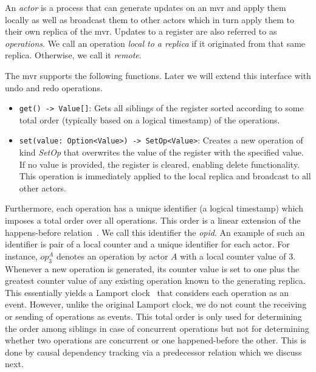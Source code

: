 \documentclass[sigplan,natbib=false,review]{acmart}
\newcommand{\op}[3][op]{$\mathit{#1}_{#2}^{#3}$} %
\newcommand{\setopkind}{\textit{SetOp}}
\begin{document}
An \emph{actor} is a process that can generate updates on an \gls*{mvr} and apply
them locally as well as broadcast them to other actors which in turn apply
them to their own replica of the \gls*{mvr}.
Updates to a register are also referred to as \emph{operations}.
We call an operation \emph{local to a replica} if it originated from that
same replica.
Otherwise, we call it \emph{remote}.

The \gls*{mvr} supports the following functions.
Later we will extend this interface with undo and redo operations.

\begin{itemize}
  \item \texttt{get() -> Value[]}:
    Gets all siblings of the register sorted
    according to some total order (typically based on a logical timestamp)
    of the operations.
  \item \texttt{set(value: Option<Value>) -> SetOp<Value>}:
    Creates a new operation of kind \setopkind{} that overwrites the value
    of the register with the specified value.
    If no value is provided, the register is cleared, enabling delete functionality.
    This operation is immediately applied to the local replica and
    broadcast to all other actors.
\end{itemize}

Furthermore, each operation has a unique identifier (a logical timestamp)
which imposes a total order over all operations.
This order is a linear extension of the happens-before relation~\cite{lamport1978time}.
We call this identifier the \emph{\gls*{opid}}.
An example of such an identifier is pair of a local counter and a unique identifier
for each actor.
For instance, \op{3}{A} denotes an operation by actor $A$
with a local counter value of $3$.
Whenever a new operation is generated, its counter value is set to one plus
the greatest counter value of any existing operation known to the generating
replica.
This essentially yields a Lamport clock~\cite{lamport1978time} that considers
each operation as an event.
However, unlike the original Lamport clock, we do not count the receiving
or sending of operations as events.
This total order is only used for determining the order among
siblings in case of concurrent operations but not for determining
whether two operations are concurrent or one happened-before the other.
This is done by causal dependency tracking via a predecessor relation
which we discuss next.
\end{document}

